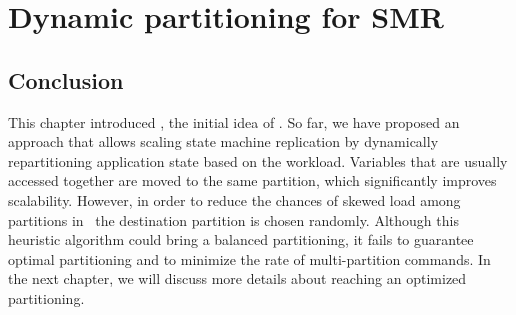 \chapter[Dynamic partitioning for SMR]{Dynamic partitioning for SMR}
\label{sec:dssmr}









\section{Conclusion}
\label{sec:dssmr-conclusion}
This chapter introduced \dssmr, the initial idea of \dynastar. So far, we have
proposed an approach that allows scaling state machine replication by
dynamically repartitioning application state based on the workload.  Variables
that are usually accessed together are moved to the same partition, which
significantly improves scalability. However, in order to reduce the chances of
skewed load among partitions in \dssmr\, the destination partition is chosen
randomly. Although this heuristic algorithm could bring a balanced partitioning,
it fails to guarantee optimal partitioning and to minimize the rate of
multi-partition commands. In the next chapter, we will discuss more details
about reaching an optimized partitioning.

